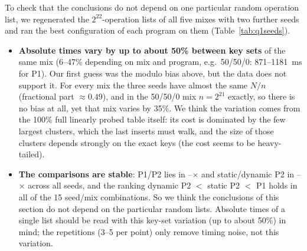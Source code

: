To check that the conclusions do not depend on one particular random operation
list, we regenerated the $2^{22}$-operation lists of all five mixes with two
further seeds and ran the best configuration of each program on them
(Table~\ref{tab:q1seeds}).
\begin{itemize}
\item \textbf{Absolute times vary by up to about 50\% between key sets} of the same
  mix (6--47\% depending on mix and program, e.g.\ 50/50/0: 871--1181~ms for P1). Our first guess was the modulo bias
  above, but the data does not support it. For every mix the three seeds have almost the
  same $N/n$ (fractional part $\approx0.49$), and in the 50/50/0 mix $n=2^{21}$
  exactly, so there is no bias at all, yet that mix varies by 35\%. We think the
  variation comes from the 100\% full linearly probed table itself: its cost is
  dominated by the few largest clusters, which the last inserts must walk, and the
  size of those clusters depends strongly on the exact keys (the cost seems to be
  heavy-tailed).
\item \textbf{The comparisons are stable}: P1/P2 lies in
  \qoneseedratioonemin--\qoneseedratioonemax$\times$ and static/dynamic P2 in
  \qoneseedratiotwomin--\qoneseedratiotwomax$\times$ across all seeds, and the
  ranking dynamic P2 $<$ static P2 $<$ P1 holds in all \qoneseedsameorder{} of
  the 15 seed/mix combinations. So we think the conclusions of this section do not
  depend on the particular random lists. Absolute times of a single list should
  be read with this key-set variation (up to about 50\%) in mind; the repetitions
  (3--5 per point) only remove timing noise, not this variation.
\end{itemize}

